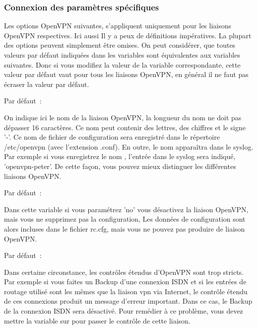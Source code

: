 \subsubsection{Connexion des paramètres spécifiques}

Les options OpenVPN suivantes, s'appliquent uniquement pour les liaisons OpenVPN
respectives. Ici aussi Il y a peux de définitions impératives. La plupart des options
peuvent simplement être omises. On peut considérer, que toutes valeurs par défaut
indiquées dans les variables  sont équivalentes aux variables
suivantes. Donc si vous modifiez la valeur de la variable 
correspondante, cette valeur par défaut vaut pour tous les liaisons OpenVPN, en
général il ne faut pas écraser la valeur par défaut.

\begin{description}


  Par défaut~: 

  On indique ici le nom de la liaison OpenVPN, la longueur du nom ne doit pas dépasser
  16 caractères. Ce nom peut contenir des lettres, des chiffres et le signe '-'. Ce
  nom de fichier de configuration sera enregistré dans le répertoire /etc/openvpn
  (avec l'extension .conf). En outre, le nom apparaîtra dans le syslog. Par exemple si
  vous enregistrez le nom , l'entrée dans le syslog sera indiqué, 'openvpn-peter'.
  De cette façon, vous pouvez mieux distinguer les différentes liaisons OpenVPN.


  Par défaut~: 

  Dans cette variable si vous paramétrez 'no' vous désactivez la liaison OpenVPN,
  mais vous ne supprimez pas la configuration, Les données de configuration sont
  alors incluses dans le fichier rc.cfg, mais vous ne pouvez pas produire de liaison
  OpenVPN.


  Par défaut~: 

  Dans certaine circonstance, les contrôles étendus d'OpenVPN sont trop stricts.
  Par exemple si vous faites un Backup d'une connexion ISDN et si les entrées de
  routage utilisé sont les mêmes que la liaison vpn via Internet, le contrôle
  étendu de ces connexions produit un message d'erreur important. Dans ce cas,
  le Backup de la connexion ISDN sera désactivé. Pour remédier à ce problème, vous
  devez mettre la variable sur  pour passer
  le contrôle de cette liaison.


\end{description}
